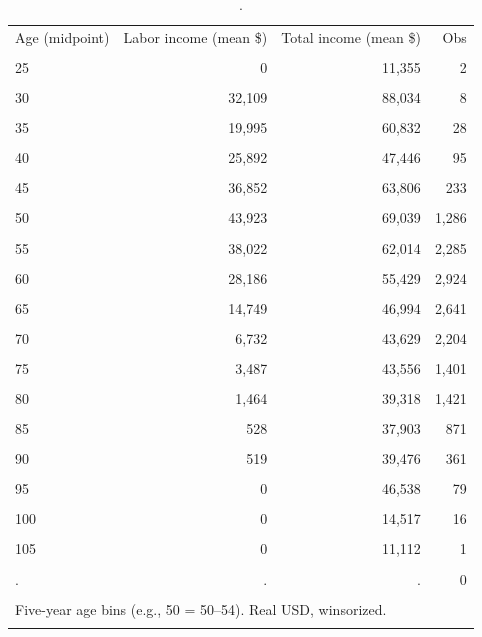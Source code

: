 \begin{table}[htbp]\centering
\caption{.}
\label{tab:income_mean_by_agegroup_2022}
\begin{tabular}{lrrr}\toprule
Age (midpoint) & Labor income (mean \$) & Total income (mean \$) & Obs \\\\ \midrule
25 & 0 & 11,355 & 2 \\\\
30 & 32,109 & 88,034 & 8 \\\\
35 & 19,995 & 60,832 & 28 \\\\
40 & 25,892 & 47,446 & 95 \\\\
45 & 36,852 & 63,806 & 233 \\\\
50 & 43,923 & 69,039 & 1,286 \\\\
55 & 38,022 & 62,014 & 2,285 \\\\
60 & 28,186 & 55,429 & 2,924 \\\\
65 & 14,749 & 46,994 & 2,641 \\\\
70 & 6,732 & 43,629 & 2,204 \\\\
75 & 3,487 & 43,556 & 1,401 \\\\
80 & 1,464 & 39,318 & 1,421 \\\\
85 & 528 & 37,903 & 871 \\\\
90 & 519 & 39,476 & 361 \\\\
95 & 0 & 46,538 & 79 \\\\
100 & 0 & 14,517 & 16 \\\\
105 & 0 & 11,112 & 1 \\\\
. & . & . & 0 \\\\
\bottomrule
\multicolumn{4}{l}{\footnotesize Five-year age bins (e.g., 50 = 50--54). Real USD, winsorized.} \\\\
\end{tabular}
\end{table}
